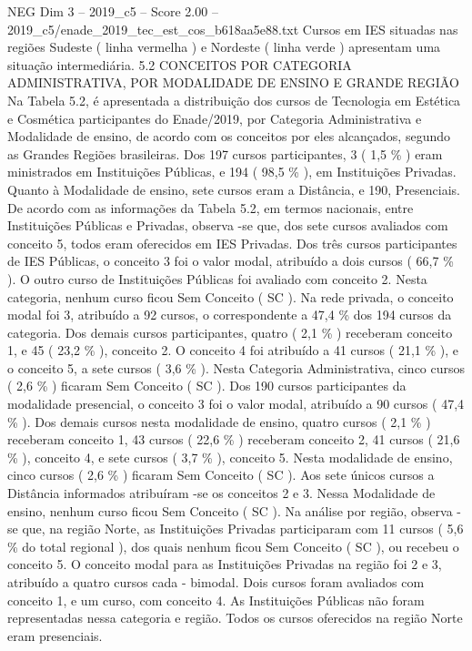 \begin{textsample}{NEG Dim 3 – 2019\_c5 – Score 2.00 – 2019\_c5/enade\_2019\_tec\_est\_cos\_b618aa5e88.txt}
Cursos em IES situadas nas regiões Sudeste ( linha vermelha ) e Nordeste ( linha verde ) apresentam uma situação intermediária. 5.2 CONCEITOS POR CATEGORIA ADMINISTRATIVA, POR MODALIDADE DE ENSINO E GRANDE REGIÃO Na Tabela 5.2, é apresentada a distribuição dos cursos de Tecnologia em Estética e Cosmética participantes do Enade/2019, por Categoria Administrativa e Modalidade de ensino, de acordo com os conceitos por eles alcançados, segundo as Grandes Regiões brasileiras.
Dos 197 cursos participantes, 3 ( 1,5 \% ) eram ministrados em Instituições Públicas, e 194 ( 98,5 \% ), em Instituições Privadas.
Quanto à Modalidade de ensino, sete cursos eram a Distância, e 190, Presenciais.
De acordo com as informações da Tabela 5.2, em termos nacionais, entre Instituições Públicas e Privadas, observa -se que, dos sete cursos avaliados com conceito 5, todos eram oferecidos em IES Privadas.
Dos três cursos participantes de IES Públicas, o conceito 3 foi o valor modal, atribuído a dois cursos ( 66,7 \% ).
O outro curso de Instituições Públicas foi avaliado com conceito 2.
Nesta categoria, nenhum curso ficou Sem Conceito ( SC ).
Na rede privada, o conceito modal foi 3, atribuído a 92 cursos, o correspondente a 47,4 \% dos 194 cursos da categoria.
Dos demais cursos participantes, quatro ( 2,1 \% ) receberam conceito 1, e 45 ( 23,2 \% ), conceito 2.
O conceito 4 foi atribuído a 41 cursos ( 21,1 \% ), e o conceito 5, a sete cursos ( 3,6 \% ).
Nesta Categoria Administrativa, cinco cursos ( 2,6 \% ) ficaram Sem Conceito ( SC ).
Dos 190 cursos participantes da modalidade presencial, o conceito 3 foi o valor modal, atribuído a 90 cursos ( 47,4 \% ).
Dos demais cursos nesta modalidade de ensino, quatro cursos ( 2,1 \% ) receberam conceito 1, 43 cursos ( 22,6 \% ) receberam conceito 2, 41 cursos ( 21,6 \% ), conceito 4, e sete cursos ( 3,7 \% ), conceito 5.
Nesta modalidade de ensino, cinco cursos ( 2,6 \% ) ficaram Sem Conceito ( SC ).
Aos sete únicos cursos a Distância informados atribuíram -se os conceitos 2 e 3.
Nessa Modalidade de ensino, nenhum curso ficou Sem Conceito ( SC ).
Na análise por região, observa -se que, na região Norte, as Instituições Privadas participaram com 11 cursos ( 5,6 \% do total regional ), dos quais nenhum ficou Sem Conceito ( SC ), ou recebeu o conceito 5.
O conceito modal para as Instituições Privadas na região foi 2 e 3, atribuído a quatro cursos cada - bimodal.
Dois cursos foram avaliados com conceito 1, e um curso, com conceito 4.
As Instituições Públicas não foram representadas nessa categoria e região.
Todos os cursos oferecidos na região Norte eram presenciais.

\end{textsample}
